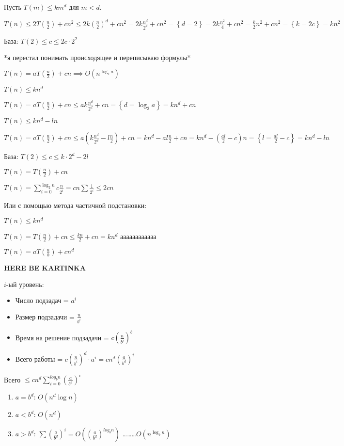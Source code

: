\documentclass[11pt,a4paper]{article}
\begin{document}
Пусть  $T(m)\leqslant km^d$ для $m<d$.

$T(n) \leqslant 2T(\frac n2) + cn^2 \leqslant 2k\left( \frac n2 \right)^d+cn^2 = 2k\frac{n^d}{2^d}+cn^2 = \left\{ d=2 \right\} = 2k\frac{n^2}{4} + cn^2 = \frac k2 n^2 + cn^2 = \left\{ k=2c \right\} = kn^2$

База: $T(2) \leqslant c \leqslant 2c\cdot2^2$

*я перестал понимать происходящее и переписываю формулы*

$T(n) = aT(\frac n2) + cn \implies O(n^{\log_2a})$

$T(n) \leqslant kn^d$

$T(n) = aT(\frac n2) + cn \leqslant ak \frac{n^d}{2^d}+cn = \left\{ d = \log_2a \right\} = kn^d + cn$

$T(n) \leqslant kn^d - ln$

$T(n) = aT(\frac n2) + cn \leqslant a\left(k \frac{n^d}{2^d}-l\frac n2\right)+cn = kn^d - al\frac n2 + cn = kn^d - \left( \frac{al}{2} - c \right)n = \left\{ l = \frac{al}{2} - c \right\} = kn^d - ln$

База: $T(2) \leqslant c \leqslant k\cdot 2^d - 2l$

$T(n) = T\left( \frac n2 \right) + cn$

$T(n) = \sum\limits_{i=0}^{\log_2n}c\frac{n}{2^i} = cn \sum\frac{1}{2^i} \leqslant 2cn$

Или с помощью метода частичной подстановки:

$T(n) \leqslant kn^d$

$T(n) = T\left( \frac n2 \right) + cn \leqslant \frac{kn}{2} + cn = kn^d$ аааааааааааа

\vspace{1cm}
$T(n) = aT\left( \frac nb \right) + cn^d$

\vspace{1.5cm}
\textbf{HERE BE KARTINKA}
\vspace{1.5cm}

$i$-ый уровень:
\begin{itemize}
    \item Число подзадач = $a^i$
    \item Размер подзадачи = $\frac{n}{b^i}$
    \item Время на решение подзадачи = $c\left( \frac{n}{b^i} \right)^b$
    \item Всего работы = $c\left(\frac{n}{b^i}\right)^d\cdot a^i = cn^d\left(\frac{a}{b^d}\right)^i$
\end{itemize}

Всего $\leqslant cn^d \sum\limits_{i=0}^{log_bn}\left( \frac{a}{b^d} \right)^i$
\begin{enumerate}
    \item $a = b^d$: $O(n^d\log n)$
    \item $a < b^d$: $O(n^d)$
    \item $a > b^d$: $\sum \left( \frac{a}{b^d} \right)^i = O\left( \left( \frac{a}{b^d} \right)^{log_bn} \right)$ \dots\dots\dots $O\left( n^{\log_bn} \right)$
\end{enumerate}
\end{document}
